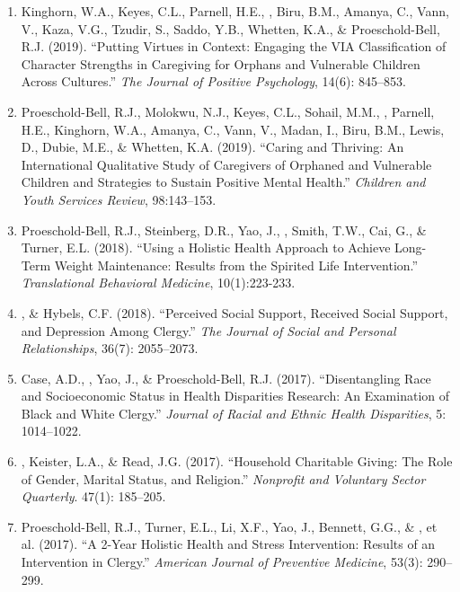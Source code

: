 \begin{enumerate}
\item Kinghorn, W.A., Keyes, C.L., Parnell, H.E., \Eagle, Biru, B.M., Amanya, C., Vann, V., Kaza, V.G., Tzudir, S., Saddo, Y.B., Whetten, K.A., \& Proeschold-Bell, R.J. (2019). ``Putting Virtues in Context: Engaging the VIA Classification of Character Strengths in Caregiving for Orphans and Vulnerable Children Across Cultures.'' \emph{The Journal of Positive Psychology}, 14(6): 845--853. 

\item Proeschold-Bell, R.J., Molokwu, N.J., Keyes, C.L., Sohail, M.M., \Eagle, Parnell, H.E., Kinghorn, W.A., Amanya, C., Vann, V., Madan, I., Biru, B.M., Lewis, D., Dubie, M.E., \& Whetten, K.A. (2019). ``Caring and Thriving: An International Qualitative Study of Caregivers of Orphaned and Vulnerable Children and Strategies to Sustain Positive Mental Health.'' \emph{Children and Youth Services Review}, 98:143--153. 

\item Proeschold-Bell, R.J., Steinberg, D.R., Yao, J., \Eagle, Smith, T.W., Cai, G., \& Turner, E.L. (2018). ``Using a Holistic Health Approach to Achieve Long-Term Weight Maintenance: Results from the Spirited Life Intervention.'' \emph{Translational Behavioral Medicine}, 10(1):223-233. 

\item \Eagle, \& Hybels, C.F. (2018). ``Perceived Social Support, Received Social Support, and Depression Among Clergy.'' \emph{The Journal of Social and Personal Relationships}, 36(7): 2055--2073. 

\item Case, A.D., \Eagle, Yao, J., \& Proeschold-Bell, R.J. (2017). ``Disentangling Race and Socioeconomic Status in Health Disparities Research: An Examination of Black and White Clergy.'' \emph{Journal of Racial and Ethnic Health Disparities}, 5: 1014--1022. 

\item \Eagle, Keister, L.A., \& Read, J.G. (2017). ``Household Charitable Giving: The Role of Gender, Marital Status, and Religion.'' \emph{Nonprofit and Voluntary Sector Quarterly}. 47(1): 185--205. 

\item Proeschold-Bell, R.J., Turner, E.L., Li, X.F., Yao, J., Bennett, G.G., \& \Eagle, et al. (2017). ``A 2-Year Holistic Health and Stress Intervention: Results of an Intervention in Clergy.'' \emph{American Journal of Preventive Medicine}, 53(3): 290--299. 


\end{enumerate}
